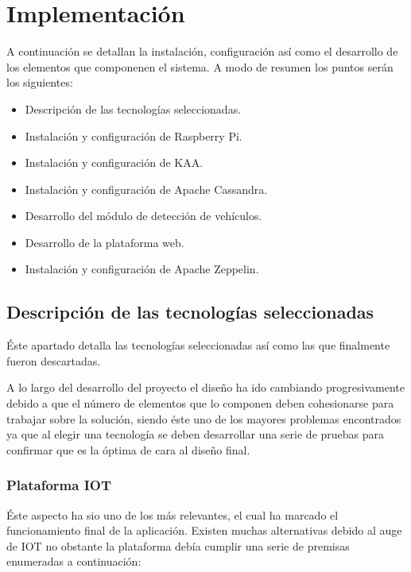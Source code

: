 \chapter{Implementación}

A continuación se detallan la instalación, configuración así como el desarrollo de los elementos que componenen el sistema. A modo de resumen los puntos serán los siguientes:

\begin{itemize}
	\item Descripción de las tecnologías seleccionadas.
	\item Instalación y configuración de Raspberry Pi.
	\item Instalación y configuración de KAA.
	\item Instalación y configuración de Apache Cassandra.
	\item Desarrollo del módulo de detección de vehículos.
	\item Desarrollo de la plataforma web.
	\item Instalación y configuración de Apache Zeppelin.
\end{itemize}

\newpage

\section{ Descripción de las tecnologías seleccionadas}

Éste apartado detalla las tecnologías seleccionadas así como las que finalmente fueron descartadas.

A lo largo del desarrollo del proyecto el diseño ha ido cambiando progresivamente debido a que el número de elementos que lo componen deben cohesionarse para trabajar sobre la solución, siendo éste uno de los mayores problemas encontrados ya que al elegir una tecnología se deben desarrollar una serie de pruebas para confirmar que es la óptima de cara al diseño final.

\newpage

\subsection{Plataforma IOT}

Éste aspecto ha sio uno de los más relevantes, el cual ha marcado el funcionamiento final de la aplicación. Existen muchas alternativas debido al auge de IOT no obstante la plataforma debía cumplir una serie de premisas enumeradas a continuación:

